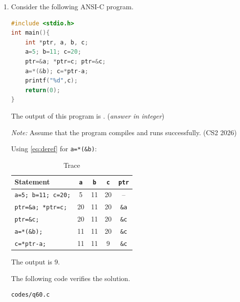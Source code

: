 \begin{enumerate}[label=\thesubsection.\arabic*, ref=\thesubsection.\theenumi]
The following code prints the truth table and counts $Y = 1$.
\begin{lstlisting}
codes/circuit.c
\end{lstlisting}

\item Consider the following ANSI-C program.
\par\medskip\noindent\begin{minipage}{\linewidth}
\begin{lstlisting}[language=C]
#include <stdio.h>
int main(){
    int *ptr, a, b, c;
    a=5; b=11; c=20;
    ptr=&a; *ptr=c; ptr=&c;
    a=*(&b); c=*ptr-a;
    printf("%d",c);
    return(0);
}
\end{lstlisting}
\end{minipage}\par\medskip
The output of this program is \underline{\hspace{1.5cm}}.
(\textit{answer in integer})

\textit{Note:} Assume that the program compiles and runs successfully.
\hfill (CS2 2026)

\solution Using \eqref{eq:deref} for \texttt{a=*(\&b)}:
\begin{table}[H]
\centering
\begin{tabular}{|l|c|c|c|c|}
\hline
\textbf{Statement} & \texttt{a} & \texttt{b} & \texttt{c} & \texttt{ptr} \\
\hline
\texttt{a=5; b=11; c=20;} & 5 & 11 & 20 & -- \\
\texttt{ptr=\&a; *ptr=c;} & 20 & 11 & 20 & \texttt{\&a} \\
\texttt{ptr=\&c;} & 20 & 11 & 20 & \texttt{\&c} \\
\texttt{a=*(\&b);} & 11 & 11 & 20 & \texttt{\&c} \\
\texttt{c=*ptr-a;} & 11 & 11 & 9 & \texttt{\&c} \\
\hline
\end{tabular}
\caption{Trace}
\end{table}
The output is $9$.

The following code verifies the solution.
\begin{lstlisting}
codes/q60.c
\end{lstlisting}


\end{enumerate}
